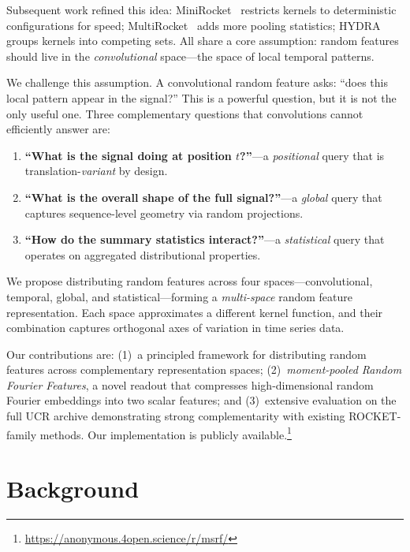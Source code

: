\documentclass{article}
\begin{document}
Subsequent work refined this idea: MiniRocket~\citep{dempster2021minirocket} restricts kernels to deterministic configurations for speed; MultiRocket~\citep{tan2022multirocket} adds more pooling statistics; HYDRA~\citep{dempster2023hydra} groups kernels into competing sets.
All share a core assumption: random features should live in the \emph{convolutional} space---the space of local temporal patterns.

We challenge this assumption.
A convolutional random feature asks: ``does this local pattern appear in the signal?''
This is a powerful question, but it is not the only useful one.
Three complementary questions that convolutions cannot efficiently answer are:
\begin{enumerate}
  \item \textbf{``What is the signal doing at position $t$?''}---a \emph{positional} query that is translation-\emph{variant} by design.
  \item \textbf{``What is the overall shape of the full signal?''}---a \emph{global} query that captures sequence-level geometry via random projections.
  \item \textbf{``How do the summary statistics interact?''}---a \emph{statistical} query that operates on aggregated distributional properties.
\end{enumerate}

We propose distributing random features across four spaces---convolutional, temporal, global, and statistical---forming a \emph{multi-space} random feature representation.
Each space approximates a different kernel function, and their combination captures orthogonal axes of variation in time series data.

Our contributions are: (1)~a principled framework for distributing random features across complementary representation spaces; (2)~\emph{moment-pooled Random Fourier Features}, a novel readout that compresses high-dimensional random Fourier embeddings into two scalar features; and (3)~extensive evaluation on the full UCR archive demonstrating strong complementarity with existing ROCKET-family methods.
Our implementation is publicly available.\footnote{\url{https://anonymous.4open.science/r/msrf/}}


\section{Background}
\label{sec:background}
\end{document}
